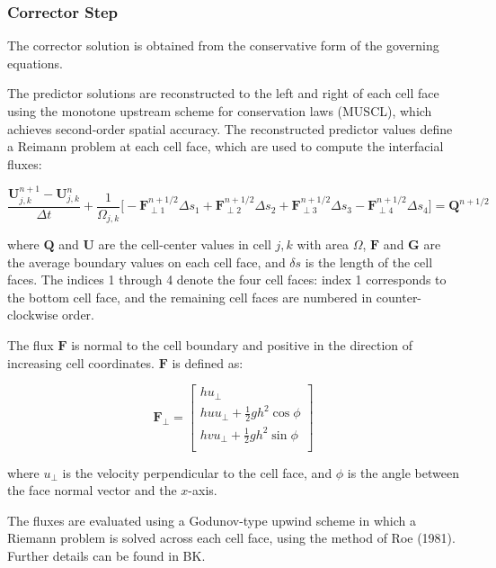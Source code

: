 \documentclass{article}
\begin{document}
 \subsubsection*{Corrector Step}
 
 The corrector solution is obtained from the conservative form of the governing equations.
 
 The predictor solutions are reconstructed to the left and right of each cell face using the monotone upstream scheme for conservation laws (MUSCL), which achieves second-order spatial accuracy.  The reconstructed predictor values define a Reimann problem at each cell face, which are used to compute the interfacial fluxes:
 
\begin{equation} \nonumber
	\dfrac{\mathbf{U}_{j,k}^{n+1} -\mathbf{U}_{j,k}^{n}}{\Delta t} 
	+ \dfrac{1}{\Omega_{j,k}} \big[ 
		- \mathbf{F}_{\perp 1}^{n+1/2} \Delta s_1
		+ \mathbf{F}_{\perp 2}^{n+1/2} \Delta s_2
		+ \mathbf{F}_{\perp 3}^{n+1/2} \Delta s_3
		- \mathbf{F}_{\perp 4}^{n+1/2} \Delta s_4		
	\big] = \mathbf{Q}^{n+1/2}
\end{equation}

\noindent where $\mathbf{Q}$ and $\mathbf{U}$ are the cell-center values in cell $j,k$ with area $\Omega$, $\mathbf{F}$ and $\mathbf{G}$ are the average boundary values on each cell face, and $\delta s$ is the length of the cell faces.
The indices 1 through 4 denote the four cell faces: index 1 corresponds to the bottom cell face, and the remaining cell faces are numbered in counter-clockwise order.

The flux $\mathbf{F}$  is normal to the cell boundary and positive in the direction of increasing cell coordinates.  $\mathbf{F}$  is defined as:

\[ \mathbf{F}_\perp = 
\begin{bmatrix} 
    h u_\perp \\[0.1cm]
    h u u_\perp + \frac{1}{2} g h^2 \cos \phi   \\[0.1cm]
    h v u_\perp + \frac{1}{2} g h^2 \sin \phi   \\[0.1cm]    
\end{bmatrix}  		
\]	

where $u_\perp$ is the velocity perpendicular to the cell face, and $\phi$ is the angle between the face normal vector and the $x$-axis.

The fluxes are evaluated using a Godunov-type upwind scheme in which a Riemann problem is solved across each cell face, using the method of Roe (1981).  Further details can be found in BK. 
%
\end{document}
